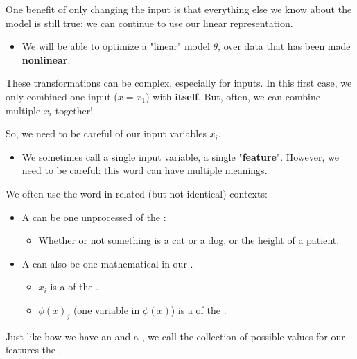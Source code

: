         One benefit of only changing the input is that everything else we know about the model is still true: we can continue to use our linear representation.
            \begin{itemize}
                \item We will be able to optimize a "linear" model $\theta$, over data that has been made \textbf{nonlinear}.
            \end{itemize}

        These transformations can be complex, especially for  inputs. In this first case, we only combined one input ($x=x_1$) with \textbf{itself}. But, often, we can combine multiple $x_i$ together!

        So, we need to be careful of our input variables $x_i$. 
        
        \begin{itemize}
            \item We sometimes call a single input variable, a single "\textbf{feature}". However, we need to be careful: this word can have multiple meanings.\\
        \end{itemize}

        \begin{clarification}
            We often use the word  in related (but not identical) contexts:

            \begin{itemize}
                \item A  can be one unprocessed  of the : 
                    \begin{itemize}
                        \item \miniex Whether or not something is a cat or a dog, or the height of a patient.
                    \end{itemize}

                \item A  can also be one mathematical  in our . 
                    \begin{itemize}
                        \item $x_i$ is a  of the .
                        \item $\phi(x)_j$ (one variable in $\phi(x)$) is a  of the .
                    \end{itemize}
            \end{itemize}

            Just like how we have an  and a , we call the collection of possible values for our features the .
        \end{clarification}
    

